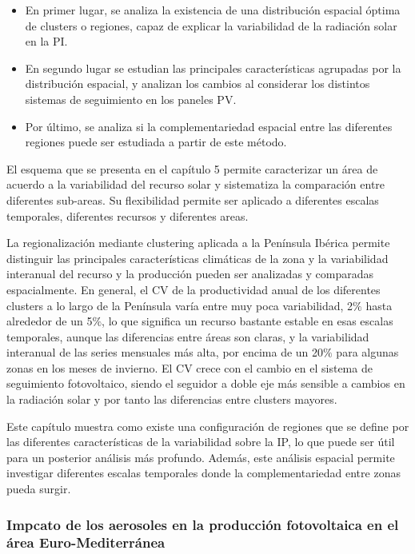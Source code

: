 \begin{itemize}
  
\item  En primer lugar, se analiza la existencia de una distribución espacial óptima de clusters o regiones, capaz de explicar la variabilidad de la radiación solar en la PI.
\item En segundo lugar se estudian las principales características agrupadas por la distribución espacial, y analizan los cambios al considerar los distintos sistemas de seguimiento en los paneles PV.
\item Por último, se analiza si la complementariedad espacial entre las diferentes regiones puede ser estudiada a partir de este método.

\end{itemize}

El esquema que se presenta en el capítulo 5 permite caracterizar un área de acuerdo a la variabilidad del recurso solar y sistematiza la comparación entre diferentes sub-areas. Su flexibilidad permite ser aplicado a diferentes escalas temporales, diferentes recursos y diferentes areas.

La regionalización mediante clustering aplicada a la Península Ibérica permite distinguir las principales características climáticas de la zona y la variabilidad interanual del recurso y la producción pueden ser analizadas y comparadas espacialmente. En general, el CV de la productividad anual de los diferentes clusters a lo largo de la Península varía entre muy poca variabilidad, 2$\%$ hasta alrededor de un 5$\%$, lo que significa un recurso bastante estable en esas escalas temporales, aunque las diferencias entre áreas son claras, y la variabilidad interanual de las series mensuales más alta, por encima de un 20$\%$ para algunas zonas en los meses de invierno. El CV crece con el cambio en el sistema de seguimiento fotovoltaico, siendo el seguidor a doble eje más sensible a cambios en la radiación solar y por tanto las diferencias entre clusters mayores.

Este capítulo muestra como existe una configuración de regiones que se define por las diferentes características de la variabilidad sobre la IP, lo que puede ser útil para un posterior análisis más profundo. Además, este análisis espacial permite investigar diferentes escalas temporales donde la complementariedad entre zonas pueda surgir.

\subsubsection{Impcato de los aerosoles en la producción fotovoltaica en el área Euro-Mediterránea}

